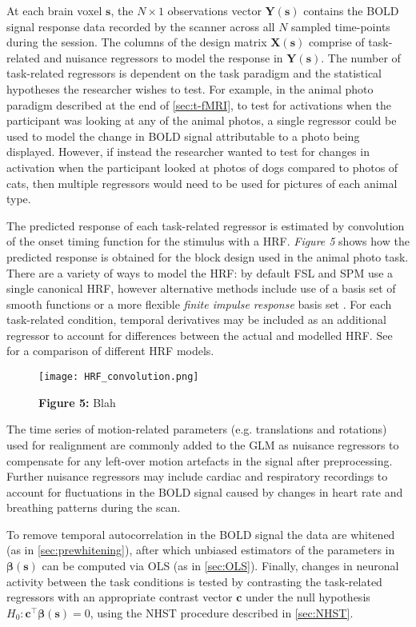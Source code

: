 At each brain voxel $\bm{s}$, the $N \times 1$ observations vector $\bm{Y}(\bm{s})$ contains the BOLD signal response data recorded by the scanner across all $N$ sampled time-points during the session. The columns of the design matrix $\bm{X}(\bm{s})$  comprise of task-related and nuisance regressors to model the response in $\bm{Y}(\bm{s})$. The number of task-related regressors is dependent on the task paradigm and the statistical hypotheses the researcher wishes to test. For example, in the animal photo paradigm described at the end of \ref{sec:t-fMRI}, to test for activations when the participant was looking at any of the animal photos, a single regressor could be used to model the change in BOLD signal attributable to a photo being displayed. However, if instead the researcher wanted to test for changes in activation when the participant looked at photos of dogs compared to photos of cats, then multiple regressors would need to be used for pictures of each animal type. 

The predicted response of each task-related regressor is estimated by convolution of the onset timing function for the stimulus with a HRF. \textit{Figure 5} shows how the predicted response is obtained for the block design used in the animal photo task. There are a variety of ways to model the HRF: by default FSL and SPM use a single canonical HRF, however alternative methods include use of a basis set of smooth functions \citep{Friston1998-jl} or a more flexible \textit{finite impulse response} basis set \citep{Goutte2000-vd}. For each task-related condition, temporal derivatives may be included as an additional regressor to account for differences between the actual and modelled HRF. See \citet{Lindquist2009-fs} for a comparison of different HRF models.

\begin{figure}[htbp]
\centering
	\texttt{[image: HRF\_convolution.png]}
\caption*{\textbf{Figure 5:} Blah}
\end{figure}

The time series of motion-related parameters (e.g. translations and rotations) used for realignment are commonly added to the GLM as nuisance regressors to compensate for any left-over motion artefacts in the signal after preprocessing. Further nuisance regressors may include cardiac and respiratory recordings to account for fluctuations in the BOLD signal caused by changes in heart rate and breathing patterns during the scan. 

To remove temporal autocorrelation in the BOLD signal the data are whitened (as in \ref{sec:prewhitening}), after which unbiased estimators of the parameters in $\bm{\beta}(\bm{s})$ can be computed via OLS (as in \ref{sec:OLS}). Finally, changes in neuronal activity between the task conditions is tested by contrasting the task-related regressors with an appropriate contrast vector $\bm{c}$ under the null hypothesis $H_{0} : \bm{c}^{\intercal}\bm{\beta}(\bm{s}) = 0$, using the NHST procedure described in \ref{sec:NHST}.  

